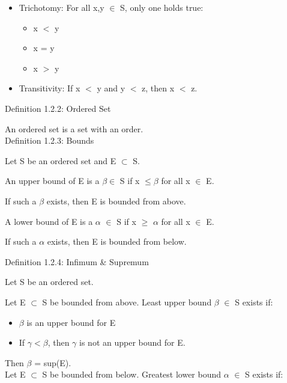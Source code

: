 	\begin{itemize}[leftmargin=2cm, itemsep=0.1cm]
		\item { \color{lblue} Trichotomy}: For all x,y $ \in $ S, only one holds true:
			\begin{itemize}[leftmargin=1cm, itemsep=0.1cm]
				\item x $<$ y
				\item x = y
				\item x $>$ y
			\end{itemize}
		\item { \color{lblue} Transitivity}: If x $<$ y and y $<$ z, then x $<$ z. \\
	\end{itemize}

{ \color{blue} Definition 1.2.2: Ordered Set }

	\qquad An ordered set is a set with an order. \\

{ \color{blue} Definition 1.2.3: Bounds }

	\qquad Let S be an ordered set and E $ \subset $ S.

	\qquad An upper bound of E is a $ \beta \in $ S if x $ \leq \beta $ for all x $ \in $ E.

	\qquad \qquad If such a $ \beta $ exists, then E is bounded from above.

	\qquad A lower bound of E is a $\alpha$ $\in$ S if x $ \geq $ $\alpha$ for all x $\in$ E.

	\qquad \qquad If such a $\alpha$ exists, then E is bounded from below.

\newpage

{ \color{blue} Definition 1.2.4: Infimum \& Supremum}

	\qquad Let S be an ordered set.

	\qquad Let E $ \subset $ S be bounded from above. Least upper bound $\beta$ $\in$ S exists if:
	
	\begin{itemize}[leftmargin=2cm, itemsep=0.1cm]
		\item $\beta$ is an upper bound for E
	
		\item If $\gamma < \beta$, then $ \gamma $ is not an upper bound for E.
	\end{itemize}

	\qquad \qquad Then $\beta$ = sup(E). \\

	\qquad Let E $\subset$ S be bounded from below. Greatest lower bound $\alpha$ $\in$ S exists if:
	
